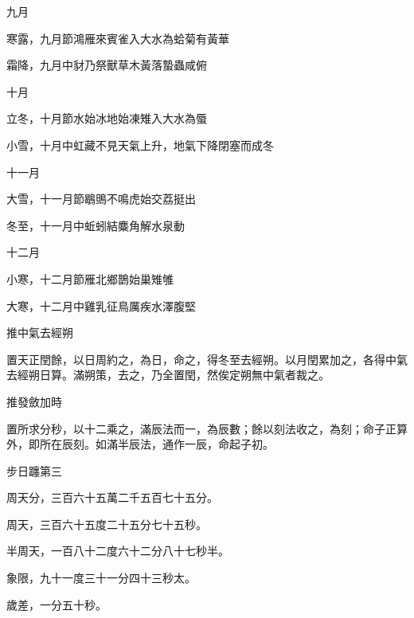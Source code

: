 \begin{pinyinscope}
 九月



 寒露，九月節鴻雁來賓雀入大水為蛤菊有黃華



 霜降，九月中豺乃祭獸草木黃落蟄蟲咸俯



 十月



 立冬，十月節水始冰地始凍雉入大水為蜃



 小雪，十月中虹藏不見天氣上升，地氣下降閉塞而成冬



 十一月



 大雪，十一月節鶡鴠不鳴虎始交荔挺出



 冬至，十一月中蚯蚓結麋角解水泉動



 十二月



 小寒，十二月節雁北鄉鵲始巢雉雊



 大寒，十二月中雞乳征鳥厲疾水澤腹堅



 推中氣去經朔



 置天正閏餘，以日周約之，為日，命之，得冬至去經朔。以月閏累加之，各得中氣去經朔日算。滿朔策，去之，乃全置閏，然俟定朔無中氣者裁之。



 推發斂加時



 置所求分秒，以十二乘之，滿辰法而一，為辰數；餘以刻法收之，為刻；命子正算外，即所在辰刻。如滿半辰法，通作一辰，命起子初。



 步日躔第三



 周天分，三百六十五萬二千五百七十五分。



 周天，三百六十五度二十五分七十五秒。



 半周天，一百八十二度六十二分八十七秒半。



 象限，九十一度三十一分四十三秒太。



 歲差，一分五十秒。




\end{pinyinscope}
